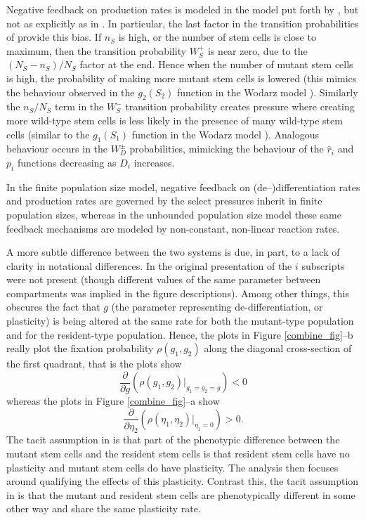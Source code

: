 \documentclass[12pt]{article}
\begin{document}
Negative feedback on production rates is modeled in the model put forth by \cite{mohammad}, but not as explicitly as in \cite{wodarz}. In particular, the last factor in the transition probabilities of \cite{mohammad} provide this bias. If $n_S$ is high, or the number of stem cells is close to maximum, then the transition probability $W_S^+$ is near zero, due to the $(N_S-n_S)/N_S$ factor at the end. Hence when the number of mutant stem cells is high, the probability of making more mutant stem cells is lowered (this mimics the behaviour observed in the $g_2(S_2)$ function in the Wodarz model \cite{wodarz}). Similarly the $n_S/N_S$ term in the $W_S^-$ transition probability creates pressure where creating more wild-type stem cells is less likely in the presence of many wild-type stem cells (similar to the $g_1(S_1)$ function in the Wodarz model \cite{wodarz}). Analogous behaviour occurs in the $W_D^{\pm}$ probabilities, mimicking the behaviour of the $\hat{r}_i$ and $p_i$ functions decreasing as $D_i$ increases. 

In the finite population size model, negative feedback on (de--)differentiation rates and production rates are governed by the select pressures inherit in finite population sizes, whereas in the unbounded population size model these same feedback mechanisms are modeled by non-constant, non-linear reaction rates. 

A more subtle difference between the two systems is due, in part, to a lack of clarity in notational differences. In the original presentation of \cite{wodarz} the $i$ subscripts were not present (though different values of the same parameter between compartments was implied in the figure descriptions). Among other things, this obscures the fact that $g$ (the parameter representing de-differentiation, or plasticity) is being altered at the same rate for both the mutant-type population and for the resident-type population. Hence, the plots in Figure \ref{combine_fig}--b really plot the fixation probability $\rho(g_1,g_2)$ along the diagonal cross-section of the first quadrant, that is the plots show
\[
\frac{\partial}{\partial g}\left(\rho(g_1,g_2)\big|_{g_1=g_2=g}\right)<0
\]
whereas the plots in Figure \ref{combine_fig}--a show
\[
\frac{\partial}{\partial \eta_2}\left(\rho(\eta_1,\eta_2)\big|_{\eta_1=0}\right)>0.
\]
The tacit assumption in \cite{mohammad} is that part of the phenotypic difference between the mutant stem cells and the resident stem cells is that resident stem cells have no plasticity and mutant stem cells do have plasticity. The analysis then focuses around qualifying the effects of this plasticity. Contrast this, the tacit assumption in \cite{wodarz} is that the mutant and resident stem cells are phenotypically different in some other way and share the same plasticity rate.
\end{document}
